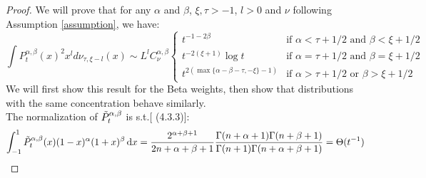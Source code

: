 \documentclass{article}
\begin{document}
\begin{proof}
We will prove that for any $\alpha$ and $\beta$, $\xi,\tau>-1$, $l>0$ and $\nu$ following Assumption \ref{assumption}, we have:
\begin{equation*}
    \int P_t^{\alpha,\beta}(x)^2x^l d\nu_{\tau,\xi-l}(x) \sim  L^lC^{\alpha,\beta}_\nu\left\{
	\begin{array}{ll}
		  t^{-1-2\beta}& \mbox{if } 
		  \alpha<\tau+1/2 \text{ and } \beta <\xi+1/2\\
		  t^{-2(\xi+1)}\log t& \mbox{if } 
		  \alpha=\tau+1/2 \text{ and } \beta =\xi+1/2\\
		  t^{2(\max\{\alpha-\beta-\tau,-\xi\}-1)}& \mbox{if } 
		  \alpha>\tau+1/2 \text{ or } \beta >\xi+1/2
	\end{array}
\right.
\end{equation*}
We will first show this result for the Beta weights, then show that distributions with the same concentration behave similarly. \\
The normalization of $\Tilde{P}^{\alpha,\beta}_t$ is s.t.[ \cite{szego1975orthogonal} (4.3.3)]:
\begin{equation}
    \int_{-1}^1\Tilde{P}_t^{\alpha,\beta}(x)(1-x)^\alpha(1+x)^\beta \mathop{}\!\mathrm{d} x=\frac{2^{\alpha+\beta+1}}{2n+\alpha+\beta+1}\frac{\Gamma(n+\alpha+1)\Gamma(n+\beta+1)}{\Gamma(n+1)\Gamma(n+\alpha+\beta+1)}=\Theta(t^{-1})
\end{equation}


\end{proof}
\end{document}
